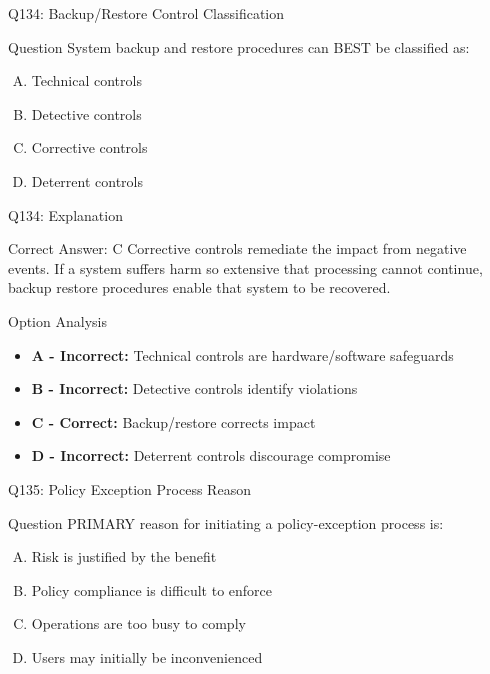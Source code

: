 \documentclass{beamer}
\begin{document}
	\begin{frame}{Q134: Backup/Restore Control Classification}
		\begin{block}{Question}
			System backup and restore procedures can BEST be classified as:
		\end{block}
		\begin{enumerate}[(A)]
			\item Technical controls
			\item Detective controls
			\item Corrective controls
			\item Deterrent controls
		\end{enumerate}
	\end{frame}
	
	\begin{frame}{Q134: Explanation}
		\begin{block}{Correct Answer: C}
			Corrective controls remediate the impact from negative events. If a system suffers harm so extensive that processing cannot continue, backup restore procedures enable that system to be recovered.
		\end{block}
		\begin{block}{Option Analysis}
			\begin{itemize}
				\item \textbf{A - Incorrect:} Technical controls are hardware/software safeguards
				\item \textbf{B - Incorrect:} Detective controls identify violations
				\item \textbf{C - Correct:} Backup/restore corrects impact
				\item \textbf{D - Incorrect:} Deterrent controls discourage compromise
			\end{itemize}
		\end{block}
	\end{frame}
	
	\begin{frame}{Q135: Policy Exception Process Reason}
		\begin{block}{Question}
			PRIMARY reason for initiating a policy-exception process is:
		\end{block}
		\begin{enumerate}[(A)]
			\item Risk is justified by the benefit
			\item Policy compliance is difficult to enforce
			\item Operations are too busy to comply
			\item Users may initially be inconvenienced
		\end{enumerate}
	\end{frame}
	
\end{document}
